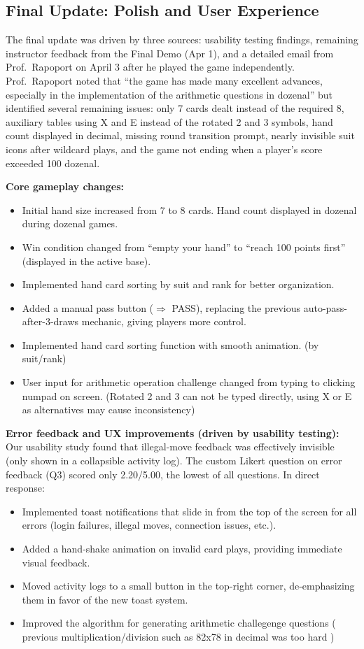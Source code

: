 \documentclass{article}
\begin{document}
\subsection{Final Update: Polish and User Experience}

The final update was driven by three sources: usability testing findings, remaining instructor feedback from the Final Demo (Apr 1), and a detailed email from Prof.\ Rapoport on April 3 after he played the game independently. Prof.\ Rapoport noted that ``the game has made many excellent advances, especially in the implementation of the arithmetic questions in dozenal'' but identified several remaining issues: only 7 cards dealt instead of the required 8, auxiliary tables using X and E instead of the rotated 2 and 3 symbols, hand count displayed in decimal, missing round transition prompt, nearly invisible suit icons after wildcard plays, and the game not ending when a player's score exceeded 100 dozenal. 

\textbf{Core gameplay changes:}
\begin{itemize}
  \item Initial hand size increased from 7 to 8 cards. Hand count displayed in dozenal during dozenal games.
  \item Win condition changed from ``empty your hand'' to ``reach 100 points first'' (displayed in the active base).
  \item Implemented hand card sorting by suit and rank for better organization.
  \item Added a manual pass button (\textsf{$\Rightarrow$ PASS}), replacing the previous auto-pass-after-3-draws mechanic, giving players more control.
  \item Implemented hand card sorting function with smooth animation. (by suit/rank)
  \item User input for arithmetic operation challenge changed from typing to clicking numpad on screen. (Rotated 2 and 3 can not be typed directly, using X or E as alternatives may cause inconsistency)
\end{itemize}

\textbf{Error feedback and UX improvements (driven by usability testing):}
Our usability study found that illegal-move feedback was effectively invisible (only shown in a collapsible activity log). The custom Likert question on error feedback (Q3) scored only 2.20/5.00, the lowest of all questions. In direct response:
\begin{itemize}
  \item Implemented toast notifications that slide in from the top of the screen for all errors (login failures, illegal moves, connection issues, etc.).
  \item Added a hand-shake animation on invalid card plays, providing immediate visual feedback.
  \item Moved activity logs to a small button in the top-right corner, de-emphasizing them in favor of the new toast system.
  \item Improved the algorithm for generating arithmetic challegenge questions ( previous multiplication/division such as 82x78 in decimal was too hard )
\end{itemize}
\end{document}
